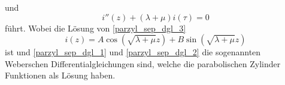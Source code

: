 und
\begin{equation}\label{parzyl_sep_dgl_3}
	i''(z) 
	+
	\left (
	\lambda
	+
	\mu 
	\right )
	i(\tau)
	=
	0
\end{equation}
führt.
Wobei die Lösung von \ref{parzyl_sep_dgl_3}
\begin{equation}
	i(z) 
	= 
	A\cos{ 
		\left ( 
		\sqrt{\lambda + \mu}z
		\right )}
	+
	B\sin{ 
		\left ( 
		\sqrt{\lambda + \mu}z
		\right )}
\end{equation}
ist und \ref{parzyl_sep_dgl_1} und \ref{parzyl_sep_dgl_2} die sogenannten Weberschen Differentialgleichungen sind, welche die parabolischen Zylinder Funktionen als Lösung haben.



